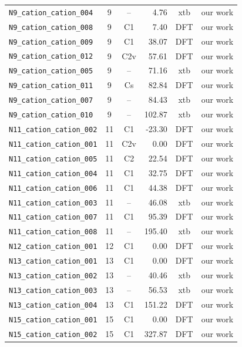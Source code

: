 {\begin{longtable}{@{}p{4.7cm}ccrcp{1.6cm}@{}}
\texttt{N9\_cation\_cation\_004} & 9 & -- & 4.76 & xtb & our work \\
\texttt{N9\_cation\_cation\_008} & 9 & C1 & 7.40 & DFT & our work \\
\texttt{N9\_cation\_cation\_009} & 9 & C1 & 38.07 & DFT & our work \\
\texttt{N9\_cation\_cation\_012} & 9 & C2v & 57.61 & DFT & our work \\
\texttt{N9\_cation\_cation\_005} & 9 & -- & 71.16 & xtb & our work \\
\texttt{N9\_cation\_cation\_011} & 9 & Cs & 82.84 & DFT & our work \\
\texttt{N9\_cation\_cation\_007} & 9 & -- & 84.43 & xtb & our work \\
\texttt{N9\_cation\_cation\_010} & 9 & -- & 102.87 & xtb & our work \\
\addlinespace
\texttt{N11\_cation\_cation\_002} & 11 & C1 & -23.30 & DFT & our work \\
\texttt{N11\_cation\_cation\_001} & 11 & C2v & 0.00 & DFT & our work \\
\texttt{N11\_cation\_cation\_005} & 11 & C2 & 22.54 & DFT & our work \\
\texttt{N11\_cation\_cation\_004} & 11 & C1 & 32.75 & DFT & our work \\
\texttt{N11\_cation\_cation\_006} & 11 & C1 & 44.38 & DFT & our work \\
\texttt{N11\_cation\_cation\_003} & 11 & -- & 46.08 & xtb & our work \\
\texttt{N11\_cation\_cation\_007} & 11 & C1 & 95.39 & DFT & our work \\
\texttt{N11\_cation\_cation\_008} & 11 & -- & 195.40 & xtb & our work \\
\addlinespace
\texttt{N12\_cation\_cation\_001} & 12 & C1 & 0.00 & DFT & our work \\
\addlinespace
\texttt{N13\_cation\_cation\_001} & 13 & C1 & 0.00 & DFT & our work \\
\texttt{N13\_cation\_cation\_002} & 13 & -- & 40.46 & xtb & our work \\
\texttt{N13\_cation\_cation\_003} & 13 & -- & 56.53 & xtb & our work \\
\texttt{N13\_cation\_cation\_004} & 13 & C1 & 151.22 & DFT & our work \\
\addlinespace
\texttt{N15\_cation\_cation\_001} & 15 & C1 & 0.00 & DFT & our work \\
\texttt{N15\_cation\_cation\_002} & 15 & C1 & 327.87 & DFT & our work \\
\end{longtable}
}
